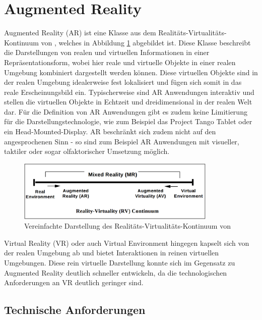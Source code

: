 
\section{Augmented Reality}

Augmented Reality (AR) ist eine Klasse aus dem Realitäts-Virtualitäts-Kontinuum von \cite{milgram1995augmented}, welches in Abbildung \ref{fig:virtual-continuum} abgebildet ist. Diese Klasse beschreibt die Darstellungen von realen und virtuellen Informationen in einer Repräsentationsform, wobei hier reale und virtuelle Objekte in einer realen Umgebung kombiniert dargestellt werden können. Diese virtuellen Objekte sind in der realen Umgebung idealerweise fest lokalisiert und fügen sich somit in das reale Erscheinungsbild ein. Typischerweise sind AR Anwendungen interaktiv und stellen die virtuellen Objekte in Echtzeit und dreidimensional in der realen Welt dar. Für die Definition von AR Anwendungen gibt es zudem keine Limitierung für die Darstellungstechnologie, wie zum Beispiel das Project Tango Tablet oder ein Head-Mounted-Display. AR beschränkt sich zudem nicht auf den angesprochenen Sinn - so sind zum Beispiel AR Anwendungen mit visueller, taktiler oder sogar olfaktorischer Umsetzung möglich.

\begin{figure}
  \centering
	\includegraphics[width=0.85\textwidth]{content/images/theory/virtual-continuum.png} 
  \caption{Vereinfachte Darstellung des Realitäts-Virtualitäts-Kontinuum von \citet*{milgram1995augmented}}
  \label{fig:virtual-continuum}
\end{figure}


Virtual Reality (VR) oder auch Virtual Environment hingegen kapselt sich von der realen Umgebung ab und bietet Interaktionen in reinen virtuellen Umgebungen. Diese rein virtuelle Darstellung konnte sich im Gegensatz zu Augmented Reality deutlich schneller entwickeln, da die technologischen Anforderungen an VR deutlich geringer sind. \citep{van2010survey}

\subsection{Technische Anforderungen}


